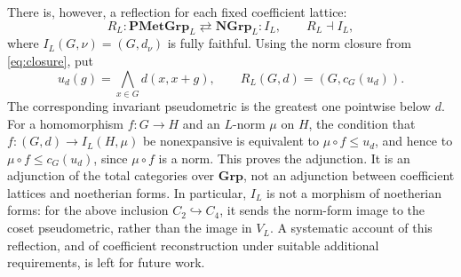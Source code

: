 \documentclass[12pt,a4paper]{amsart}
\theoremstyle{definition}
\newcommand{\Grp}{\mathbf{Grp}}
\newcommand{\NGrp}{\mathbf{NGrp}}
\begin{document}
There is, however, a reflection for each fixed coefficient lattice:
\[
 R_L:\mathbf{PMetGrp}_L\rightleftarrows\NGrp_L:I_L,
 \qquad R_L\dashv I_L,
\]
where $I_L(G,\nu)=(G,d_\nu)$ is fully faithful. Using the norm closure from \eqref{eq:closure}, put
\[
 u_d(g)=\bigwedge_{x\in G}d(x,x+g),\qquad
 R_L(G,d)=(G,c_G(u_d)).
\]
The corresponding invariant pseudometric is the greatest one pointwise below $d$. For a homomorphism $f:G\to H$ and an $L$-norm $\mu$ on $H$, the condition that $f:(G,d)\to I_L(H,\mu)$ be nonexpansive is equivalent to $\mu\circ f\leq u_d$, and hence to $\mu\circ f\leq c_G(u_d)$, since $\mu\circ f$ is a norm. This proves the adjunction. It is an adjunction of the total categories over $\Grp$, not an adjunction between coefficient lattices and noetherian forms. In particular, $I_L$ is not a morphism of noetherian forms: for the above inclusion $C_2\hookrightarrow C_4$, it sends the norm-form image to the coset pseudometric, rather than the image in $V_L$. A systematic account of this reflection, and of coefficient reconstruction under suitable additional requirements, is left for future work.
\end{document}
